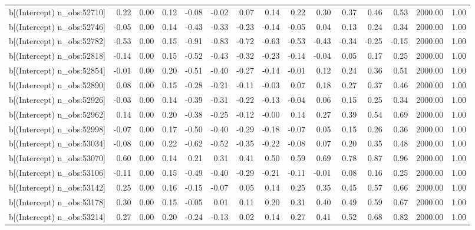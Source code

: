 \begin{table}[ht]
\begin{tabular}{rrrrrrrrrrrrrrr}
  b[(Intercept) n\_obs:52710] & 0.22 & 0.00 & 0.12 & -0.08 & -0.02 & 0.07 & 0.14 & 0.22 & 0.30 & 0.37 & 0.46 & 0.53 & 2000.00 & 1.00 \\ 
  b[(Intercept) n\_obs:52746] & -0.05 & 0.00 & 0.14 & -0.43 & -0.33 & -0.23 & -0.14 & -0.05 & 0.04 & 0.13 & 0.24 & 0.34 & 2000.00 & 1.00 \\ 
  b[(Intercept) n\_obs:52782] & -0.53 & 0.00 & 0.15 & -0.91 & -0.83 & -0.72 & -0.63 & -0.53 & -0.43 & -0.34 & -0.25 & -0.15 & 2000.00 & 1.00 \\ 
  b[(Intercept) n\_obs:52818] & -0.14 & 0.00 & 0.15 & -0.52 & -0.43 & -0.32 & -0.23 & -0.14 & -0.04 & 0.05 & 0.17 & 0.25 & 2000.00 & 1.00 \\ 
  b[(Intercept) n\_obs:52854] & -0.01 & 0.00 & 0.20 & -0.51 & -0.40 & -0.27 & -0.14 & -0.01 & 0.12 & 0.24 & 0.36 & 0.51 & 2000.00 & 1.00 \\ 
  b[(Intercept) n\_obs:52890] & 0.08 & 0.00 & 0.15 & -0.28 & -0.21 & -0.11 & -0.03 & 0.07 & 0.18 & 0.27 & 0.37 & 0.46 & 2000.00 & 1.00 \\ 
  b[(Intercept) n\_obs:52926] & -0.03 & 0.00 & 0.14 & -0.39 & -0.31 & -0.22 & -0.13 & -0.04 & 0.06 & 0.15 & 0.25 & 0.34 & 2000.00 & 1.00 \\ 
  b[(Intercept) n\_obs:52962] & 0.14 & 0.00 & 0.20 & -0.38 & -0.25 & -0.12 & -0.00 & 0.14 & 0.27 & 0.39 & 0.54 & 0.69 & 2000.00 & 1.00 \\ 
  b[(Intercept) n\_obs:52998] & -0.07 & 0.00 & 0.17 & -0.50 & -0.40 & -0.29 & -0.18 & -0.07 & 0.05 & 0.15 & 0.26 & 0.36 & 2000.00 & 1.00 \\ 
  b[(Intercept) n\_obs:53034] & -0.08 & 0.00 & 0.22 & -0.62 & -0.52 & -0.35 & -0.22 & -0.08 & 0.07 & 0.20 & 0.35 & 0.48 & 2000.00 & 1.00 \\ 
  b[(Intercept) n\_obs:53070] & 0.60 & 0.00 & 0.14 & 0.21 & 0.31 & 0.41 & 0.50 & 0.59 & 0.69 & 0.78 & 0.87 & 0.96 & 2000.00 & 1.00 \\ 
  b[(Intercept) n\_obs:53106] & -0.11 & 0.00 & 0.15 & -0.49 & -0.40 & -0.29 & -0.21 & -0.11 & -0.01 & 0.08 & 0.16 & 0.25 & 2000.00 & 1.00 \\ 
  b[(Intercept) n\_obs:53142] & 0.25 & 0.00 & 0.16 & -0.15 & -0.07 & 0.05 & 0.14 & 0.25 & 0.35 & 0.45 & 0.57 & 0.66 & 2000.00 & 1.00 \\ 
  b[(Intercept) n\_obs:53178] & 0.30 & 0.00 & 0.15 & -0.05 & 0.01 & 0.11 & 0.20 & 0.31 & 0.40 & 0.49 & 0.59 & 0.67 & 2000.00 & 1.00 \\ 
  b[(Intercept) n\_obs:53214] & 0.27 & 0.00 & 0.20 & -0.24 & -0.13 & 0.02 & 0.14 & 0.27 & 0.41 & 0.52 & 0.68 & 0.82 & 2000.00 & 1.00 \\ 

\end{tabular}
\end{table}
